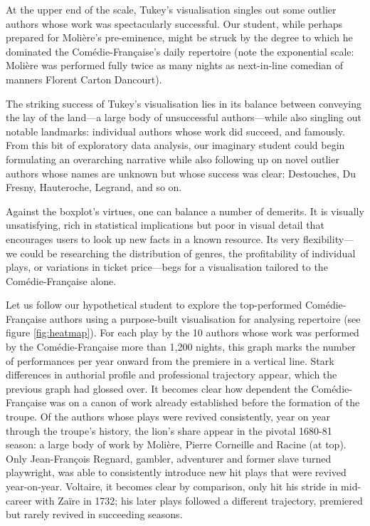 \documentclass[	DIV=calc,%
							paper=a4,%
							fontsize=11pt,%
							twocolumn]{scrartcl}	 					%
\begin{document}
At the upper end of the scale, Tukey’s visualisation singles out some outlier authors whose work was spectacularly successful.  Our student, while perhaps prepared for Molière’s pre-eminence, might be struck by the degree to which he dominated the Comédie-Française’s daily repertoire (note the exponential scale: Molière was performed fully twice as many nights as next-in-line comedian of manners Florent Carton Dancourt).

The striking success of Tukey’s visualisation lies in its balance between conveying the lay of the land—a large body of unsuccessful authors—while also singling out notable landmarks: individual authors whose work did succeed, and famously.  From this bit of exploratory data analysis, our imaginary student could begin formulating an overarching narrative while also following up on novel outlier authors whose names are unknown but whose success was clear: Destouches, Du Fresny, Hauteroche, Legrand, and so on.

Against the boxplot’s virtues, one can balance a number of demerits.  It is visually unsatisfying, rich in statistical implications but poor in visual detail that encourages users to look up new facts in a known resource.  Its very flexibility—we could be researching the distribution of genres, the profitability of individual plays, or variations in ticket price—begs for a visualisation tailored to the Comédie-Française alone.

Let us follow our hypothetical student to explore the top-performed Comédie-Française authors using a purpose-built visualisation for analysing repertoire (see figure
\ref{fig:heatmap}).  For each play by the 10 authors whose work was performed by the Comédie-Française more than 1,200 nights, this graph marks the number of performances per year onward from the premiere in a vertical line.  Stark differences in authorial profile and professional trajectory appear, which the previous graph had glossed over.  It becomes clear how dependent the Comédie-Française was on a canon of work already established before the formation of the troupe.  Of the authors whose plays were revived consistently, year on year through the troupe’s history, the lion’s share appear in the pivotal 1680-81 season: a large body of work by Molière, Pierre Corneille and Racine (at top).  Only Jean-François Regnard, gambler, adventurer and former slave turned playwright, was able to consistently introduce new hit plays that were revived year-on-year.  Voltaire, it becomes clear by comparison, only hit his stride in mid-career with Zaïre in 1732; his later plays followed a different trajectory, premiered but rarely revived in succeeding seasons.
\end{document}
